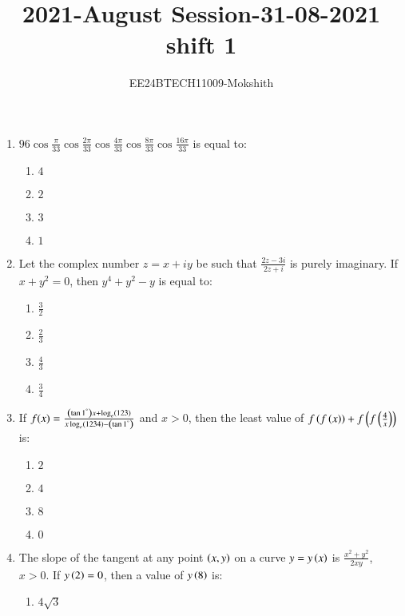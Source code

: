 \documentclass[journal]{IEEEtran}
\begin{document}

\title{2021-August Session-31-08-2021 shift 1}
\author{EE24BTECH11009-Mokshith}
{\let\newpage\relax\maketitle}
\renewcommand{\thefigure}{\theenumi}
\renewcommand{\thetable}{\theenumi}
\setlength{\intextsep}{10pt} %
\renewcommand{\thetable}{\theenumi}

\begin{enumerate}[start=16]
\item $96\cos \frac{\pi}{33} \cos\frac{2\pi}{33} \cos\frac{4\pi}{33} \cos\frac{8\pi}{33} \cos\frac{16\pi}{33}$
is equal to:
\begin{enumerate}
    \item $4$
    \item $2$
    \item $3$
    \item $1$
\end{enumerate}
\item Let the complex number $z = x + iy$ be such that 
$\frac{2z - 3i}{2z + i}$ is purely imaginary. If $x + y^2 = 0$, then $y^4 + y^2 - y$ is equal to:
\begin{enumerate}
    \item $\frac{3}{2}$
    \item $\frac{2}{3}$
    \item $\frac{4}{3}$
    \item $\frac{3}{4}$
\end{enumerate}
\item If $f(x) = \frac{\left(\tan 1^\degree\right) x + \log_e\left(123\right)}{x \log_e\left(1234\right)-\left(\tan 1^\degree\right)}$ and $x > 0$, then the least value of 
$f\left(f\left(x\right)\right) + f\left(f\left(\frac{4}{x}\right)\right)$ is:
\begin{enumerate}
    \item $2$
    \item $4$
    \item $8$
    \item $0$
\end{enumerate}
\item The slope of the tangent at any point $\left(x, y\right)$ on a curve $y = y\left(x\right)$ is 
$\frac{x^2 + y^2}{2xy}$, $x > 0$. If $y\left(2\right) = 0$, then a value of $y\left(8\right)$ is:
\begin{enumerate}
    \item $4\sqrt{3}$

\end{enumerate}
\end{enumerate}
\end{document}
